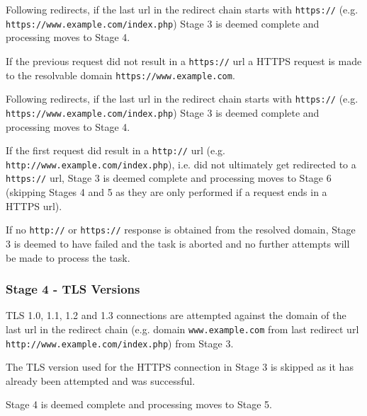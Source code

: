 \documentclass{mscreport}
\begin{document}
\vspace{0.3cm} \noindent
Following redirects, if the last url in the redirect chain starts with \newline \texttt{https://} (e.g. \texttt{https://www.example.com/index.php}) Stage 3 is deemed complete and processing moves to Stage 4.

\vspace{0.3cm} \noindent
If the previous request did not result in a \texttt{https://} url a HTTPS request is made to the resolvable domain \texttt{https://www.example.com}.

\vspace{0.3cm} \noindent
Following redirects, if the last url in the redirect chain starts with \texttt{https://} (e.g. \newline \texttt{https://www.example.com/index.php}) Stage 3 is deemed complete and processing moves to Stage 4.

\vspace{0.3cm} \noindent
If the first request did result in a \texttt{http://} url (e.g. \texttt{http://www.example.com/index.php}), i.e. did not ultimately get redirected to a \texttt{https://} url, Stage 3 is deemed complete and processing moves to Stage 6 (skipping Stages 4 and 5 as they are only performed if a request ends in a HTTPS url).

\vspace{0.3cm} \noindent
If no \texttt{http://} or \texttt{https://} response is obtained from the resolved domain, Stage 3 is deemed to have failed and the task is aborted and no further attempts will be made to process the task.

\subsubsection{Stage 4 - TLS Versions}

TLS 1.0, 1.1, 1.2 and 1.3 connections are attempted against the domain of the last url in the redirect chain (e.g. domain \texttt{www.example.com} from last redirect url \newline \texttt{http://www.example.com/index.php}) from Stage 3.

\vspace{0.3cm} \noindent
The TLS version used for the HTTPS connection in Stage 3 is skipped as it has already been attempted and was successful.


\vspace{0.3cm} \noindent
Stage 4 is deemed complete and processing moves to Stage 5.
\end{document}
